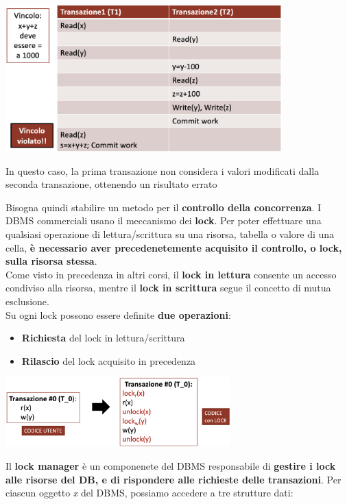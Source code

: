 \documentclass{article}
\begin{document}
\begin{enumerate}[leftmargin=1cm]
\begin{center}
        \includegraphics[width=0.8\textwidth]{foto 4.png}
    \end{center}
    In questo caso, la prima transazione non considera i valori modificati dalla seconda transazione, ottenendo un risultato errato
\end{enumerate}
Bisogna quindi stabilire un metodo per il \textbf{controllo della concorrenza}. I DBMS commerciali usano il meccanismo dei \textbf{lock}. Per poter effettuare una qualsiasi operazione di lettura/scrittura su una risorsa, tabella o valore di una cella, \textbf{è necessario aver precedenetemente acquisito il controllo, o lock, sulla risorsa stessa}. \\
Come visto in precedenza in altri corsi, il \textbf{lock in lettura} consente un accesso condiviso alla risorsa, mentre il \textbf{lock in scrittura} segue il concetto di mutua esclusione.\\
Su ogni lock possono essere definite \textbf{due operazioni}:
\begin{itemize}[label={-}, leftmargin=1cm]
    \item \textbf{Richiesta} del lock in lettura/scrittura
    \item \textbf{Rilascio} del lock acquisito in precedenza
\end{itemize}
\begin{center}
    \includegraphics[width=0.65\textwidth]{foto 5.png}
\end{center}
Il \textbf{lock manager} è un componenete del DBMS responsabile di \textbf{gestire i lock alle risorse del DB, e di rispondere alle richieste delle transazioni}. Per ciascun oggetto \textit{x} del DBMS, possiamo accedere a tre strutture dati:
\end{document}
